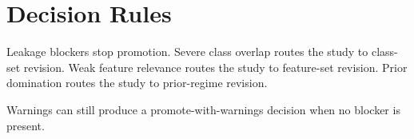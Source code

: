 \section{Decision Rules}

Leakage blockers stop promotion. Severe class overlap routes the study to class-set revision. Weak feature relevance routes the study to feature-set revision. Prior domination routes the study to prior-regime revision.

Warnings can still produce a promote-with-warnings decision when no blocker is present.

